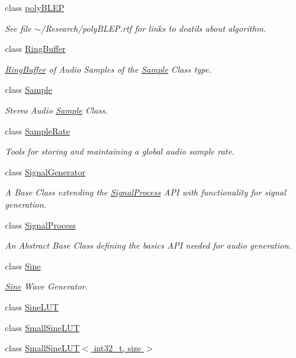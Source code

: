 \begin{DoxyCompactItemize}
class \hyperlink{classDSG_1_1polyBLEP}{poly\+B\+L\+E\+P}
\begin{DoxyCompactList}\small\item\em See file $\sim$/\+Research/poly\+B\+L\+E\+P.rtf for links to deatils about algorithm. \end{DoxyCompactList}\item 
class \hyperlink{classDSG_1_1RingBuffer}{Ring\+Buffer}
\begin{DoxyCompactList}\small\item\em \hyperlink{classDSG_1_1RingBuffer}{Ring\+Buffer} of Audio Samples of the \hyperlink{classDSG_1_1Sample}{Sample} Class type. \end{DoxyCompactList}\item 
class \hyperlink{classDSG_1_1Sample}{Sample}
\begin{DoxyCompactList}\small\item\em Stereo Audio \hyperlink{classDSG_1_1Sample}{Sample} Class. \end{DoxyCompactList}\item 
class \hyperlink{classDSG_1_1SampleRate}{Sample\+Rate}
\begin{DoxyCompactList}\small\item\em Tools for storing and maintaining a global audio sample rate. \end{DoxyCompactList}\item 
class \hyperlink{classDSG_1_1SignalGenerator}{Signal\+Generator}
\begin{DoxyCompactList}\small\item\em A Base Class extending the \hyperlink{classDSG_1_1SignalProcess}{Signal\+Process} A\+P\+I with functionality for signal generation. \end{DoxyCompactList}\item 
class \hyperlink{classDSG_1_1SignalProcess}{Signal\+Process}
\begin{DoxyCompactList}\small\item\em An Abstract Base Class defining the basics A\+P\+I needed for audio generation. \end{DoxyCompactList}\item 
class \hyperlink{classDSG_1_1Sine}{Sine}
\begin{DoxyCompactList}\small\item\em \hyperlink{classDSG_1_1Sine}{Sine} Wave Generator. \end{DoxyCompactList}\item 
class \hyperlink{classDSG_1_1SineLUT}{Sine\+L\+U\+T}
\item 
class \hyperlink{classDSG_1_1SmallSineLUT}{Small\+Sine\+L\+U\+T}
\item 
class \hyperlink{classDSG_1_1SmallSineLUT_3_01int32__t_00_01size_01_4}{Small\+Sine\+L\+U\+T$<$ int32\+\_\+t, size $>$}
\end{DoxyCompactItemize}
